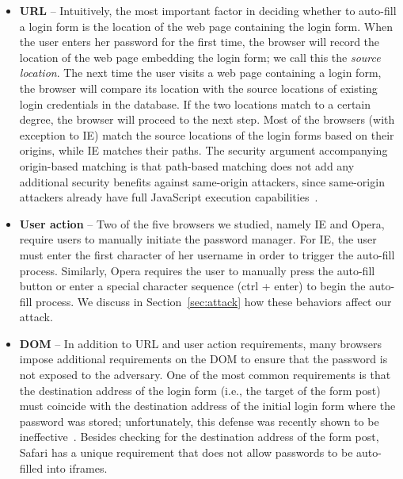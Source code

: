 \documentclass[letterpaper,twocolumn,10pt]{article}
\begin{document}
\begin{itemize}
	\item \textbf{URL} -- Intuitively, the most important factor 
in deciding whether to auto-fill a login form is the location of the 
web page containing the login form. When the user enters her password 
for the first time, the browser will record the location of the web 
page embedding the login form; we call this the \emph{source 
location}. The next time the user visits a web page containing a login 
form, the browser will compare its location with the source locations 
of existing login credentials in the database. If the two locations 
match to a certain degree, the browser will proceed to the next step. 
Most of the browsers (with exception to IE) match the source locations 
of the login forms based on their origins, while IE matches their 
paths. The security argument accompanying origin-based matching is 
that path-based matching does not add any additional security benefits 
against same-origin attackers, since same-origin attackers already have 
full JavaScript execution capabilities~\cite{beware}. 
	
	\item \textbf{User action} -- Two of the five browsers we 
studied, namely IE and Opera, require users to manually initiate the 
password manager. For IE, the user must enter the first character of 
her username in order to trigger the auto-fill process. Similarly, 
Opera requires the user to manually press the auto-fill button or 
enter a special character sequence (ctrl + enter) to begin the auto-fill 
process. We discuss in Section~\ref{sec:attack} how these 
behaviors affect our attack.
	
	\item \textbf{DOM} -- In addition to URL and user action 
requirements, many browsers impose additional requirements on the DOM 
to ensure that the password is not exposed to the adversary. One of 
the most common requirements is that the destination address of the 
login form (i.e., the target of the form post) must coincide with the 
destination address of the initial login form where the password was 
stored; unfortunately, this defense was recently shown to be 
ineffective~\cite{selfexfiltration}. Besides checking for the 
destination address of the form post, Safari has a unique requirement 
that does not allow passwords to be auto-filled into iframes. 
\end{itemize}
\end{document}
